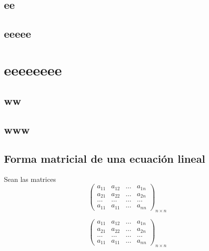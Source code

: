 \documentclass[10pt,]{krantz}
\theoremstyle{definition}
\theoremstyle{definition}
\theoremstyle{definition}
\theoremstyle{remark}
\begin{document}
\hypertarget{ee}{%
\section{ee}\label{ee}}

\hypertarget{eeeee}{%
\section{eeeee}\label{eeeee}}

\hypertarget{eeeeeeee}{%
\chapter{eeeeeeee}\label{eeeeeeee}}

\hypertarget{ww}{%
\section{ww}\label{ww}}

\hypertarget{www}{%
\section{www}\label{www}}

\hypertarget{forma-matricial-de-una-ecuaciuxf3n-lineal}{%
\section{Forma matricial de una ecuación lineal}\label{forma-matricial-de-una-ecuaciuxf3n-lineal}}

Sean las matrices
\[\begin{pmatrix}
a_{11}&a_{12}&\ldots&a_{1n}\\
a_{21}&a_{22}&\ldots&a_{2n}\\
\ldots& \ldots&\ldots&\ldots\\
a_{11}&a_{11}&\ldots&a_{nn}
\end{pmatrix}_{n\times n}\]

\[\begin{pmatrix}
a_{11}&a_{12}&\ldots&a_{1n}\\
a_{21}&a_{22}&\ldots&a_{2n}\\
\ldots& \ldots&\ldots&\ldots\\
a_{11}&a_{11}&\ldots&a_{nn}
\end{pmatrix}_{n\times n}\]



\printindex
\end{document}
